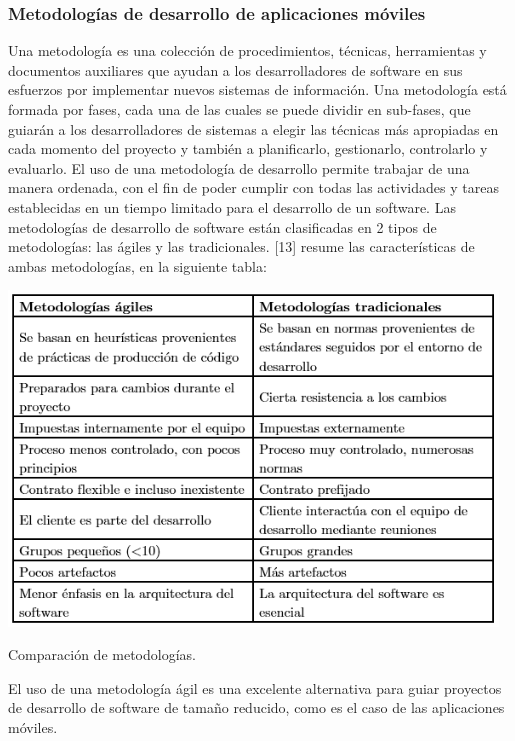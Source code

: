 \documentclass[12pt,letterpaper,openany]{book}
\begin{document}
\subsubsection{Metodologías de desarrollo de aplicaciones móviles}
Una metodología es una colección de procedimientos, técnicas, herramientas y documentos auxiliares que ayudan a los desarrolladores de software en sus esfuerzos por implementar nuevos sistemas de información. Una metodología está formada por fases, cada una de las cuales se puede dividir en sub-fases, que guiarán a los desarrolladores de sistemas a elegir las técnicas más apropiadas en cada momento del proyecto y también a planificarlo, gestionarlo, controlarlo y evaluarlo.
\vspace{5mm}\newline
El uso de una metodología de desarrollo permite trabajar de una manera ordenada, con el fin de poder cumplir con todas las actividades y tareas establecidas en un tiempo limitado para el desarrollo de un software. 
\vspace{5mm}\newline
Las metodologías de desarrollo de software están clasificadas en 2 tipos de metodologías: las ágiles y las tradicionales. [13] resume las características de ambas metodologías, en la siguiente tabla:

\begin{table}[H]
\centering
\includegraphics[width=13cm]{./imagenes/tablas/comparacion_metodologias}
\caption{Comparación de metodologías.}
\end{table}

El uso de una metodología ágil es una excelente alternativa para guiar proyectos de desarrollo de software de tamaño reducido, como es el caso de las aplicaciones móviles. 
\end{document}
